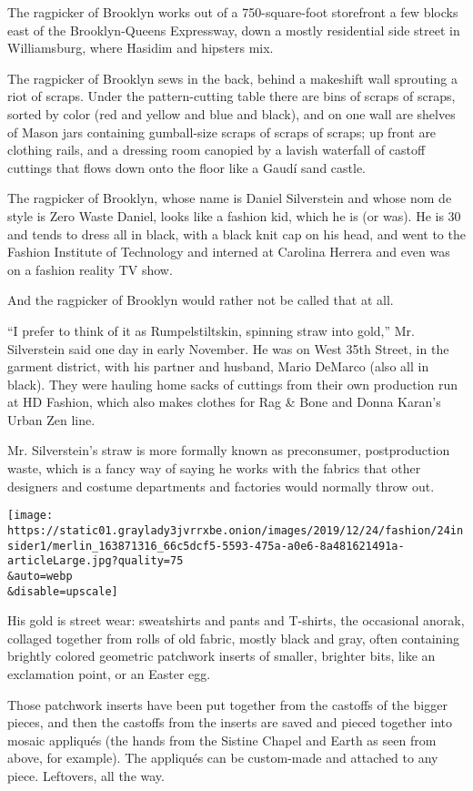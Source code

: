 The ragpicker of Brooklyn works out of a 750-square-foot storefront a
few blocks east of the Brooklyn-Queens Expressway, down a mostly
residential side street in Williamsburg, where Hasidim and hipsters mix.

The ragpicker of Brooklyn sews in the back, behind a makeshift wall
sprouting a riot of scraps. Under the pattern-cutting table there are
bins of scraps of scraps, sorted by color (red and yellow and blue and
black), and on one wall are shelves of Mason jars containing
gumball-size scraps of scraps of scraps; up front are clothing rails,
and a dressing room canopied by a lavish waterfall of castoff cuttings
that flows down onto the floor like a Gaudí sand castle.

The ragpicker of Brooklyn, whose name is Daniel Silverstein and whose
nom de style is Zero Waste Daniel, looks like a fashion kid, which he is
(or was). He is 30 and tends to dress all in black, with a black knit
cap on his head, and went to the Fashion Institute of Technology and
interned at Carolina Herrera and even was on a fashion reality TV show.

And the ragpicker of Brooklyn would rather not be called that at all.

``I prefer to think of it as Rumpelstiltskin, spinning straw into
gold,'' Mr. Silverstein said one day in early November. He was on West
35th Street, in the garment district, with his partner and husband,
Mario DeMarco (also all in black). They were hauling home sacks of
cuttings from their own production run at HD Fashion, which also makes
clothes for Rag \& Bone and Donna Karan's Urban Zen line.

Mr. Silverstein's straw is more formally known as preconsumer,
postproduction waste, which is a fancy way of saying he works with the
fabrics that other designers and costume departments and factories would
normally throw out.

\texttt{[image: https://static01.graylady3jvrrxbe.onion/images/2019/12/24/fashion/24insider1/merlin\_163871316\_66c5dcf5-5593-475a-a0e6-8a481621491a-articleLarge.jpg?quality=75\\\&auto=webp\\\&disable=upscale]}

His gold is street wear: sweatshirts and pants and T-shirts, the
occasional anorak, collaged together from rolls of old fabric, mostly
black and gray, often containing brightly colored geometric patchwork
inserts of smaller, brighter bits, like an exclamation point, or an
Easter egg.

Those patchwork inserts have been put together from the castoffs of the
bigger pieces, and then the castoffs from the inserts are saved and
pieced together into mosaic appliqués (the hands from the Sistine Chapel
and Earth as seen from above, for example). The appliqués can be
custom-made and attached to any piece. Leftovers, all the way.

